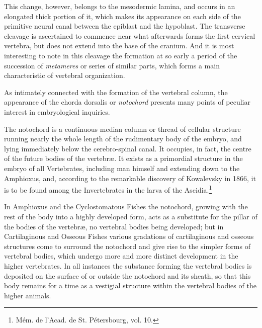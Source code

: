 \documentclass[a4paper, 11pt, oneside, english]{article}
\begin{document}
This change, however, belongs to the mesodermic lamina, and occurs in an elongated thick portion of it, which makes its appearance on each side of the primitive neural canal between the epiblast and the hypoblast. The transverse cleavage is ascertained to commence near what afterwards forms the first cervical vertebra, but does not extend into the base of the cranium. And it is most interesting to note in this cleavage the formation at so early a period of the succession of \emph{metameres} or series of similar parts, which forms a main characteristic of vertebral organization.

As intimately connected with the formation of the vertebral column, the appearance of the chorda dorsalis or \emph{notochord} presents many points of peculiar interest in embryological inquiries.

The notochord is a continuous median column or thread of cellular structure running nearly the whole length of the rudimentary body of the embryo, and lying immediately below the cerebro-spinal canal. It occupies, in fact, the centre of the future bodies of the vertebræ. It exists as a primordial structure in the embryo of all Vertebrates, including man himself and extending down to the Amphioxus, and, according to the remarkable discovery of Kowalevsky in 1866, it is to be found among the Invertebrates in the larva of the Ascidia.\footnote{Mém. de l'Acad. de St. Pétersbourg, vol. 10.}

In Amphioxus and the Cyclostomatous Fishes the notochord, growing with the rest of the body into a highly developed form, acts as a substitute for the pillar of the bodies of the vertebræ, no vertebral bodies being developed; but in Cartilaginous and Osseous Fishes various gradations of cartilaginous and osseous structures come to surround the notochord and give rise to the simpler forms of vertebral bodies, which undergo more and more distinct development in the higher vertebrates. In all instances the substance forming the vertebral bodies is deposited on the surface of or outside the notochord and its sheath, so that this body remains for a time as a vestigial structure within the vertebral bodies of the higher animals.
\end{document}
